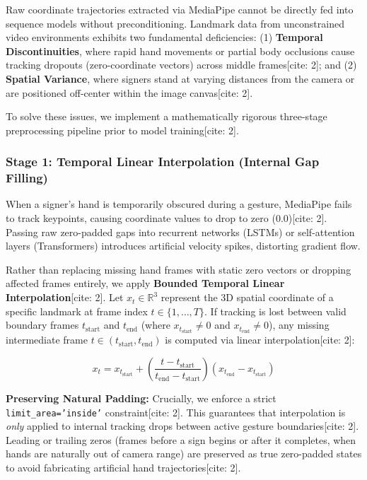 \documentclass[12pt,a4paper]{article}
\begin{document}
Raw coordinate trajectories extracted via MediaPipe cannot be directly fed into sequence models without preconditioning. Landmark data from unconstrained video environments exhibits two fundamental deficiencies: (1) \textbf{Temporal Discontinuities}, where rapid hand movements or partial body occlusions cause tracking dropouts (zero-coordinate vectors) across middle frames[cite: 2]; and (2) \textbf{Spatial Variance}, where signers stand at varying distances from the camera or are positioned off-center within the image canvas[cite: 2].

To solve these issues, we implement a mathematically rigorous three-stage preprocessing pipeline prior to model training[cite: 2].

\subsubsection{Stage 1: Temporal Linear Interpolation (Internal Gap Filling)}

When a signer's hand is temporarily obscured during a gesture, MediaPipe fails to track keypoints, causing coordinate values to drop to zero ($0.0$)[cite: 2]. Passing raw zero-padded gaps into recurrent networks (LSTMs) or self-attention layers (Transformers) introduces artificial velocity spikes, distorting gradient flow.

Rather than replacing missing hand frames with static zero vectors or dropping affected frames entirely, we apply \textbf{Bounded Temporal Linear Interpolation}[cite: 2]. Let $x_t \in \mathbb{R}^3$ represent the 3D spatial coordinate of a specific landmark at frame index $t \in \{1, \dots, T\}$. If tracking is lost between valid boundary frames $t_{\text{start}}$ and $t_{\text{end}}$ (where $x_{t_{\text{start}}} \neq 0$ and $x_{t_{\text{end}}} \neq 0$), any missing intermediate frame $t \in (t_{\text{start}}, t_{\text{end}})$ is computed via linear interpolation[cite: 2]:

\begin{equation}
x_t = x_{t_{\text{start}}} + \left( \frac{t - t_{\text{start}}}{t_{\text{end}} - t_{\text{start}}} \right) \left( x_{t_{\text{end}}} - x_{t_{\text{start}}} \right)
\end{equation}

\textbf{Preserving Natural Padding:} Crucially, we enforce a strict \texttt{limit\_area='inside'} constraint[cite: 2]. This guarantees that interpolation is \textit{only} applied to internal tracking drops between active gesture boundaries[cite: 2]. Leading or trailing zeros (frames before a sign begins or after it completes, when hands are naturally out of camera range) are preserved as true zero-padded states to avoid fabricating artificial hand trajectories[cite: 2].
\end{document}
